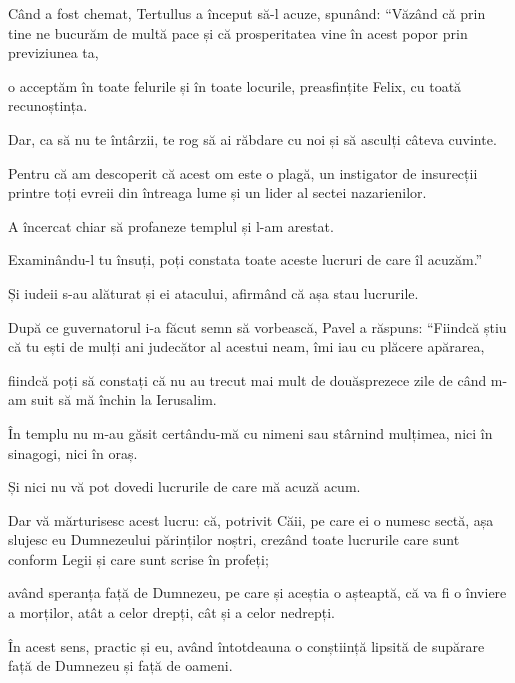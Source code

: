{Când a fost chemat, Tertullus a început să-l acuze, spunând: “Văzând că prin tine ne bucurăm de multă pace și că prosperitatea vine în acest popor prin previziunea ta,

o acceptăm în toate felurile și în toate locurile, preasfințite Felix, cu toată recunoștința.

Dar, ca să nu te întârzii, te rog să ai răbdare cu noi și să asculți câteva cuvinte.

Pentru că am descoperit că acest om este o plagă, un instigator de insurecții printre toți evreii din întreaga lume și un lider al sectei nazarienilor.

A încercat chiar să profaneze templul și l-am arestat.


 Examinându-l tu însuți, poți constata toate aceste lucruri de care îl acuzăm.”


\par }{\PP {}Și iudeii s-au alăturat și ei atacului, afirmând că așa stau lucrurile.


\par }{\PP {}După ce guvernatorul i-a făcut semn să vorbească, Pavel a răspuns: “Fiindcă știu că tu ești de mulți ani judecător al acestui neam, îmi iau cu plăcere apărarea,

fiindcă poți să constați că nu au trecut mai mult de douăsprezece zile de când m-am suit să mă închin la Ierusalim.

În templu nu m-au găsit certându-mă cu nimeni sau stârnind mulțimea, nici în sinagogi, nici în oraș.

Și nici nu vă pot dovedi lucrurile de care mă acuză acum.

Dar vă mărturisesc acest lucru: că, potrivit Căii, pe care ei o numesc sectă, așa slujesc eu Dumnezeului părinților noștri, crezând toate lucrurile care sunt conform Legii și care sunt scrise în profeți;

având speranța față de Dumnezeu, pe care și aceștia o așteaptă, că va fi o înviere a morților, atât a celor drepți, cât și a celor nedrepți.

În acest sens, practic și eu, având întotdeauna o conștiință lipsită de supărare față de Dumnezeu și față de oameni.

}

